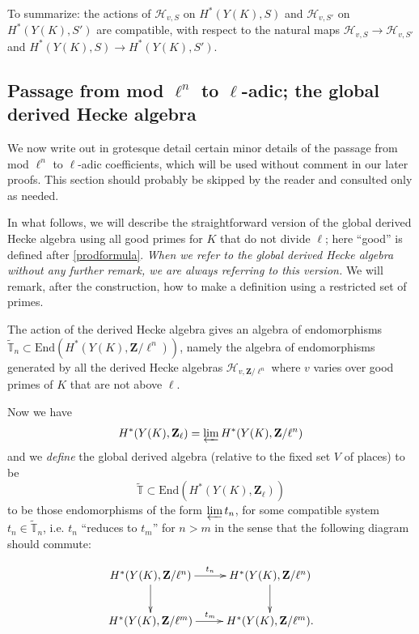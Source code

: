 \documentclass[10pt]{amsart}
\newcommand{\changecolor}{black}
\newcommand{\Z}{\mathbf{Z}}
\newcommand{\gHecke}{\tilde{\mathbb{T}}}
\theoremstyle{remark}
\begin{document}
To summarize: the actions of $\mathscr{H}_{v,S}$ on $H^*(Y(K), S)$ and
  $\mathscr{H}_{v, S'}$ on $H^*(Y(K), S')$ are compatible, with respect to the natural maps $\mathscr{H}_{v,S} \rightarrow \mathscr{H}_{v,S'}$
  and $H^*(Y(K), S) \rightarrow H^*(Y(K), S')$. 
  
  
  
  

\subsection{Passage from mod $\ell^n$ to $\ell$-adic; the global derived Hecke algebra} \label{limit}

We now write out in grotesque detail certain minor details of the  passage from mod $\ell^n$ to $\ell$-adic coefficients, which will be used without comment in our later proofs.  
 This section should probably be skipped by the reader and consulted only as needed.  
 
 {\color{\changecolor} In what follows, we will describe the straightforward version of the global derived Hecke algebra
using all good primes for $K$ that do not divide $\ell$;  here ``good'' is defined  after \eqref{prodformula}.
{\em When we refer to the global derived Hecke
algebra without any further remark, we are always referring to this version. }
We will remark, after the construction, how to make a definition
using a restricted set of primes.  }

 
  \index{$\gHecke$} 
The action of the derived Hecke algebra gives an algebra of endomorphisms $\widetilde{\mathbb{T}}_n \subset \mathrm{End}( H^*(Y(K), \Z/\ell^n))$, namely
the algebra of endomorphisms generated by all  the derived Hecke algebras $\mathscr{H}_{v, \Z/\ell^n}$
where $v$ varies over good primes of $K$ that are not above $\ell$. 


Now we have
$$H^*(Y(K), \Z_{\ell}) = \varprojlim H^*(Y(K), \Z/\ell^n)$$ 
and we {\em define} the global derived algebra (relative to the fixed set $V$ of places)
to be 
\begin{equation} \label{gHeckedef} \gHecke \subset \mathrm{End}(H^*(Y(K), \Z_{\ell}))\end{equation}
to be those endomorphisms of the form $\varprojlim t_n$,   for some compatible system $t_n \in \gHecke_n$, i.e.
$t_n$ ``reduces to $t_{m}$'' for $n > m$ in
the sense that the following diagram should commute:

 \begin{equation}
 \xymatrix{
H^*(Y(K), \Z/\ell^n)  \ar[r]^{t_n} \ar[d] & H^*(Y(K), \Z/\ell^n)  \ar[d] \\
H^*(Y(K), \Z/\ell^{m})  \ar[r]^{t_{m}} & H^*(Y(K), \Z/\ell^{m}) . 
 }
\end{equation}
\end{document}
